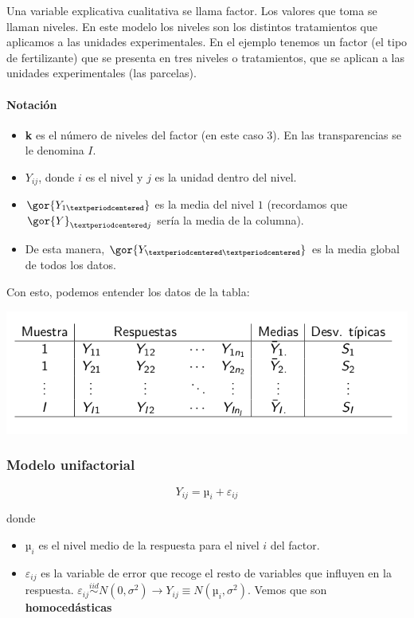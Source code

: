 Una variable explicativa cualitativa se llama factor. Los valores que toma se llaman niveles. En este modelo los niveles son los distintos tratamientos que aplicamos a las unidades experimentales. En el ejemplo tenemos un factor (el tipo de fertilizante) que se presenta en tres niveles o tratamientos, que se aplican a las unidades experimentales (las parcelas).


\paragraph{Notación}
\begin{itemize}
\item \textbf{k} es el número de niveles del factor (en este caso 3). En las transparencias se le denomina $I$.
\item $Y_{ij}$, donde $i$ es el nivel y $j$ es la unidad dentro del nivel.
\item $\gor{Y_{1·}}$ es la media del nivel $1$ (recordamos que $\gor{Y}_{·j}$ sería la media de la columna).
\item De esta manera, $\gor{Y_{··}}$ es la media global de todos los datos.
\end{itemize}

Con esto, podemos entender los datos de la tabla:

\begin{center}
\includegraphics[scale=0.6]{img/ModeloUnifactorial.png}
\end{center}


\subsubsection{Modelo unifactorial}

\[Y_{ij} = µ_i + ε_{ij}\]

donde
\begin{itemize}
	\item $µ_i$ es el nivel medio de la respuesta para el nivel $i$ del factor.
	\item $ε_{ij}$ es la variable de error que recoge el resto de variables que
influyen en la respuesta.
	\subitem $ε_{ij} \overset{iid}{\sim} N(0,σ^2) \to Y_{ij} \equiv N(µ_i,σ^2)$.
	\subitem Vemos que son \textbf{homocedásticas}
\end{itemize}

